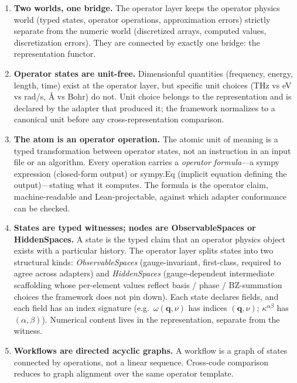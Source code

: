 \documentclass[11pt,a4paper]{article}
\begin{document}
\begin{enumerate}[leftmargin=2.5em, itemsep=0.4em]
  \item \textbf{Two worlds, one bridge.} The operator layer keeps the operator physics world
        (typed states, operator operations, approximation errors) strictly separate from
        the numeric world (discretized arrays, computed values, discretization errors).
        They are connected by exactly one bridge: the representation functor.

  \item \textbf{Operator states are unit-free.} Dimensionful quantities (frequency,
        energy, length, time) exist at the operator layer, but specific unit choices
        (THz vs eV vs rad/s, \AA{} vs Bohr) do not. Unit choice belongs to the
        representation and is declared by the adapter that produced it; the framework
        normalizes to a canonical unit before any cross-representation comparison.

  \item \textbf{The atom is an operator operation.} The atomic unit of meaning is a typed
        transformation between operator states, not an instruction in an input file or an
        algorithm. Every operation carries a \emph{operator formula}---a sympy expression
        (closed-form output) or sympy.Eq (implicit equation defining the output)---stating
        what it computes. The formula is the operator claim, machine-readable and
        Lean-projectable, against which adapter conformance can be checked.

  \item \textbf{States are typed witnesses; nodes are ObservableSpaces or HiddenSpaces.}
        A state is the typed claim that an operator physics object exists with a
        particular history. The operator layer splits states into two structural kinds:
        \emph{ObservableSpaces} (gauge-invariant, first-class, required to agree across
        adapters) and \emph{HiddenSpaces} (gauge-dependent intermediate scaffolding
        whose per-element values reflect basis / phase / BZ-summation choices the
        framework does not pin down). Each state declares fields, and each field has an
        index signature (e.g.\ $\omega(\mathbf{q},\nu)$ has indices $(\mathbf{q}, \nu)$;
        $\kappa^{\alpha\beta}$ has $(\alpha, \beta)$). Numerical content lives in the
        representation, separate from the witness.

  \item \textbf{Workflows are directed acyclic graphs.} A workflow is a graph of states
        connected by operations, not a linear sequence. Cross-code comparison reduces
        to graph alignment over the same operator template.


\end{enumerate}
\end{document}
